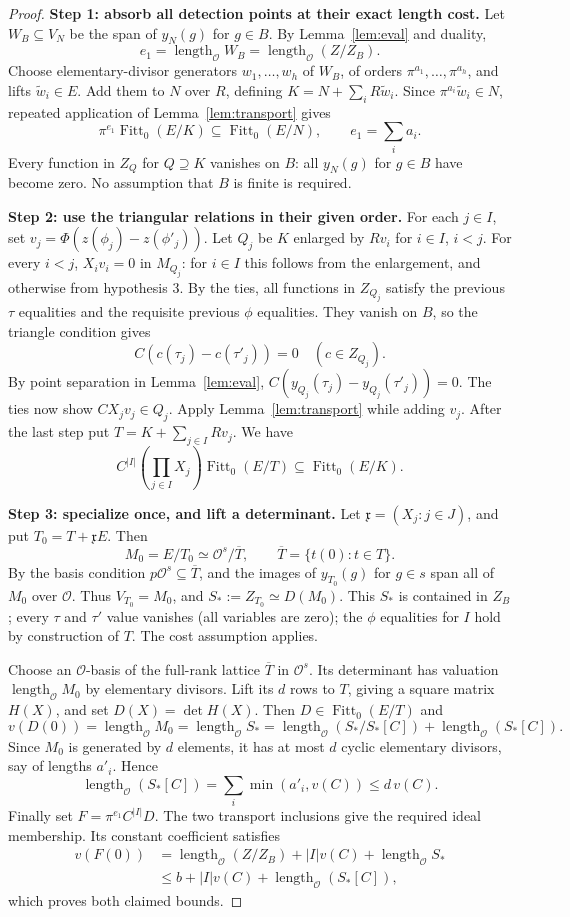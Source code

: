 \documentclass[11pt]{article}
\newcommand{\OO}{\mathcal O}\newcommand{\FF}{\operatorname{Fitt}_0}\newcommand{\len}{\operatorname{length}_{\OO}}\newcommand{\val}{\operatorname{v}}\newcommand{\Hom}{\operatorname{Hom}}\newcommand{\Span}{\operatorname{span}}\newcommand{\code}[1]{\texttt{\detokenize{#1}}}
\begin{document}
\begin{proof}
\textbf{Step 1: absorb all detection points at their exact length cost.}
Let $W_B\subseteq V_N$ be the span of $y_N(g)$ for $g\in B$. By Lemma~\ref{lem:eval} and duality,
\[
 e_1=\len W_B=\len(Z/Z_B).
\]
Choose elementary-divisor generators $w_1,\dots,w_h$ of $W_B$, of orders $\pi^{a_1},\dots,\pi^{a_h}$, and lifts $\tilde w_i\in E$. Add them to $N$ over $R$, defining $K=N+\sum_iR\tilde w_i$. Since $\pi^{a_i}\tilde w_i\in N$, repeated application of Lemma~\ref{lem:transport} gives
\[
 \pi^{e_1}\FF(E/K)\subseteq \FF(E/N),\qquad e_1=\sum_i a_i.
\]
Every function in $Z_Q$ for $Q\supseteq K$ vanishes on $B$: all $y_N(g)$ for $g\in B$ have become zero. No assumption that $B$ is finite is required.

\textbf{Step 2: use the triangular relations in their given order.}
For each $j\in I$, set $v_j=\Phi(z(\phi_j)-z(\phi'_j))$. Let $Q_j$ be $K$ enlarged by $Rv_i$ for $i\in I$, $i<j$. For every $i<j$, $X_i v_i=0$ in $M_{Q_j}$: for $i\in I$ this follows from the enlargement, and otherwise from hypothesis 3. By the ties, all functions in $Z_{Q_j}$ satisfy the previous $\tau$ equalities and the requisite previous $\phi$ equalities. They vanish on $B$, so the triangle condition gives
\[
 C(c(\tau_j)-c(\tau'_j))=0\quad(c\in Z_{Q_j}).
\]
By point separation in Lemma~\ref{lem:eval}, $C(y_{Q_j}(\tau_j)-y_{Q_j}(\tau'_j))=0$. The ties now show $CX_jv_j\in Q_j$. Apply Lemma~\ref{lem:transport} while adding $v_j$. After the last step put $T=K+\sum_{j\in I}Rv_j$. We have
\[
 C^{|I|}\left(\prod_{j\in I} X_j\right)\FF(E/T)\subseteq\FF(E/K).
\]

\textbf{Step 3: specialize once, and lift a determinant.}
Let $\mathfrak x=(X_j:j\in J)$, and put $T_0=T+\mathfrak x E$. Then
\[
 M_0=E/T_0\simeq \OO^s/\overline T,
 \qquad \overline T=\{t(0):t\in T\}.
\]
By the basis condition $p\OO^s\subseteq\overline T$, and the images of $y_{T_0}(g)$ for $g\in s$ span all of $M_0$ over $\OO$. Thus $V_{T_0}=M_0$, and $S_*:=Z_{T_0}\simeq D(M_0)$. This $S_*$ is contained in $Z_B$; every $\tau$ and $\tau'$ value vanishes (all variables are zero); the $\phi$ equalities for $I$ hold by construction of $T$. The cost assumption applies.

Choose an $\OO$-basis of the full-rank lattice $\overline T$ in $\OO^s$. Its determinant has valuation $\len M_0$ by elementary divisors. Lift its $d$ rows to $T$, giving a square matrix $H(X)$, and set $D(X)=\det H(X)$. Then $D\in\FF(E/T)$ and
\[
 v(D(0))=\len M_0=\len S_*=\len(S_*/S_*[C])+\len(S_*[C]).
\]
Since $M_0$ is generated by $d$ elements, it has at most $d$ cyclic elementary divisors, say of lengths $a'_i$. Hence
\[
 \len(S_*[C])=\sum_i\min(a'_i,v(C))\le d\,v(C).
\]
Finally set $F=\pi^{e_1}C^{|I|}D$. The two transport inclusions give the required ideal membership. Its constant coefficient satisfies
\begin{align*}
 v(F(0))&=\len(Z/Z_B)+|I|v(C)+\len S_*\\
 &\le b+|I|v(C)+\len(S_*[C]),
\end{align*}
which proves both claimed bounds.
\end{proof}
\end{document}
